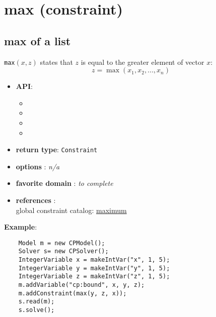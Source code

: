 \label{max}
\hypertarget{max}{}

\section{max (constraint)}\label{max:maxconstraint}\hypertarget{max:maxconstraint}{}

\subsection{max of a list}\label{max:maxofalist}\hypertarget{max:maxofalist}{}

\begin{notedef}
\texttt{max}$(x,z)$ states that $z$ is equal to the greater element of vector $x$:
$$z = \max(x_1, x_2, ..., x_n)$$  
\end{notedef}

\begin{itemize}
	\item \textbf{API}:
	\begin{itemize}
		\item {}
		\item {}
		\item {}
		\item {}
	\end{itemize}
	\item \textbf{return type}: \texttt{Constraint}
	\item \textbf{options} : \emph{n/a}
	\item \textbf{favorite domain} : \emph{to complete}
	\item \textbf{references} :\\
      global constraint catalog: \href{http://www.emn.fr/x-info/sdemasse/gccat/Cmaximum.html}{maximum}
\end{itemize}

\textbf{Example}:
\begin{lstlisting}
	Model m = new CPModel();
	Solver s= new CPSolver();
	IntegerVariable x = makeIntVar("x", 1, 5);
	IntegerVariable y = makeIntVar("y", 1, 5);
	IntegerVariable z = makeIntVar("z", 1, 5);
	m.addVariable("cp:bound", x, y, z);
	m.addConstraint(max(y, z, x));
	s.read(m);
	s.solve();
\end{lstlisting}

